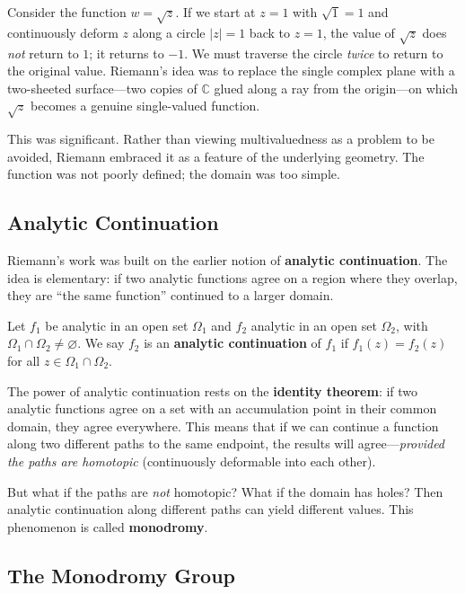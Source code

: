 Consider the function $w = \sqrt{z}$. If we start at $z = 1$ with $\sqrt{1} = 1$ and continuously deform $z$ along a circle $|z| = 1$ back to $z = 1$, the value of $\sqrt{z}$ does \emph{not} return to $1$; it returns to $-1$. We must traverse the circle \emph{twice} to return to the original value. Riemann's idea was to replace the single complex plane with a two-sheeted surface---two copies of $\mathbb{C}$ glued along a ray from the origin---on which $\sqrt{z}$ becomes a genuine single-valued function.

This was significant. Rather than viewing multivaluedness as a problem to be avoided, Riemann embraced it as a feature of the underlying geometry. The function was not poorly defined; the domain was too simple.

\subsection{Analytic Continuation}

Riemann's work was built on the earlier notion of \textbf{analytic continuation}. The idea is elementary: if two analytic functions agree on a region where they overlap, they are ``the same function'' continued to a larger domain.

\begin{definition}
Let $f_1$ be analytic in an open set $\Omega_1$ and $f_2$ analytic in an open set $\Omega_2$, with $\Omega_1 \cap \Omega_2 \neq \varnothing$. We say $f_2$ is an \textbf{analytic continuation} of $f_1$ if $f_1(z) = f_2(z)$ for all $z \in \Omega_1 \cap \Omega_2$.
\end{definition}

The power of analytic continuation rests on the \textbf{identity theorem}: if two analytic functions agree on a set with an accumulation point in their common domain, they agree everywhere. This means that if we can continue a function along two different paths to the same endpoint, the results will agree---\emph{provided the paths are homotopic} (continuously deformable into each other).

But what if the paths are \emph{not} homotopic? What if the domain has holes? Then analytic continuation along different paths can yield different values. This phenomenon is called \textbf{monodromy}.

\subsection{The Monodromy Group}


